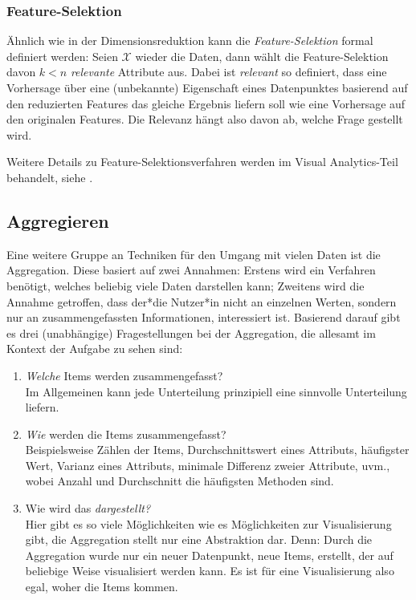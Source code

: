 			\subsubsection{Feature-Selektion}
				Ähnlich wie in der Dimensionsreduktion kann die \emph{Feature-Selektion} formal definiert werden: Seien \(\mathcal{X}\) wieder die Daten, dann wählt die Feature-Selektion davon \( k < n \) \emph{relevante} Attribute aus. Dabei ist \emph{relevant} so definiert, dass eine Vorhersage über eine (unbekannte) Eigenschaft eines Datenpunktes basierend auf den reduzierten Features das gleiche Ergebnis liefern soll wie eine Vorhersage auf den originalen Features. Die Relevanz hängt also davon ab, welche Frage gestellt wird.

				Weitere Details zu Feature-Selektionsverfahren werden im Visual Analytics-Teil behandelt, siehe .

		\subsection{Aggregieren}
			Eine weitere Gruppe an Techniken für den Umgang mit vielen Daten ist die Aggregation. Diese basiert auf zwei Annahmen: Erstens wird ein Verfahren benötigt, welches beliebig viele Daten darstellen kann; Zweitens wird die Annahme getroffen, dass der*die Nutzer*in nicht an einzelnen Werten, sondern nur an zusammengefassten Informationen, interessiert ist. Basierend darauf gibt es drei (unabhängige) Fragestellungen bei der Aggregation, die allesamt im Kontext der Aufgabe zu sehen sind:
			\begin{enumerate}
				\item \emph{Welche} Items werden zusammengefasst? \\
					Im Allgemeinen kann jede Unterteilung prinzipiell eine sinnvolle Unterteilung liefern.
				\item \emph{Wie} werden die Items zusammengefasst? \\
					Beispielsweise Zählen der Items, Durchschnittswert eines Attributs, häufigster Wert, Varianz eines Attributs, minimale Differenz zweier Attribute, uvm., wobei Anzahl und Durchschnitt die häufigsten Methoden sind.
				\item Wie wird das \emph{dargestellt?} \\
					Hier gibt es so viele Möglichkeiten wie es Möglichkeiten zur Visualisierung gibt, die Aggregation stellt nur eine Abstraktion dar. Denn: Durch die Aggregation wurde nur ein neuer Datenpunkt, \bzw neue Items, erstellt, der auf beliebige Weise visualisiert werden kann. Es ist für eine Visualisierung also egal, woher die Items kommen.
			\end{enumerate}

